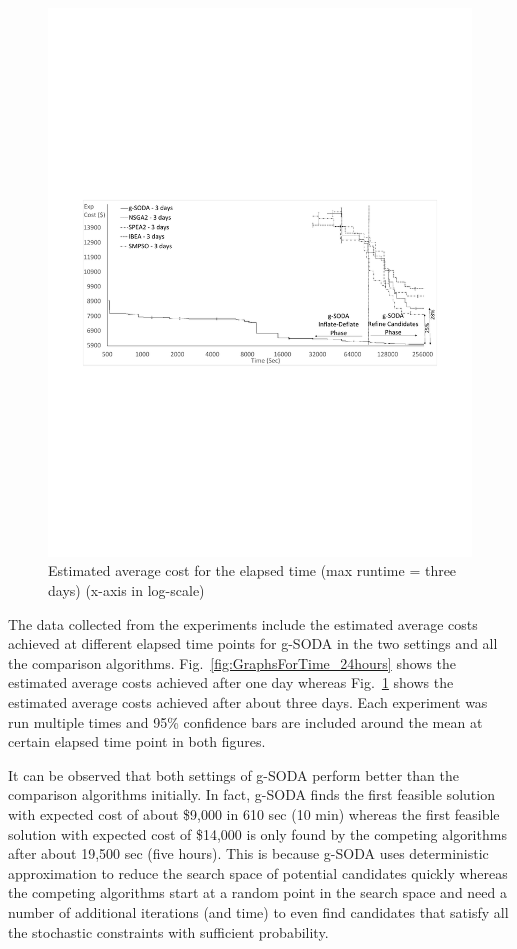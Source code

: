 \documentclass[a4paper, 12pt]{article} %
\begin{document}
\begin{figure}[t]
\begin{minipage}{.5\textwidth}
\begin{center}
	\includegraphics[width=\textwidth]{images/sodavsjmetal3day.pdf}
	\caption{Estimated average cost for the elapsed time (max runtime = three days) (x-axis in log-scale)}
	\label{fig:GraphsForTime_3days}       %
\end{center}
\end{minipage}
\end{figure}

The data collected from the experiments include the estimated average costs achieved at different elapsed time points for g-SODA in the two settings and all the comparison algorithms. 
Fig.~\ref{fig:GraphsForTime_24hours} shows the estimated average costs achieved after one day whereas Fig.~\ref{fig:GraphsForTime_3days} shows the estimated average costs achieved after about three days. Each experiment was run multiple times and 95\% confidence bars are included around the mean at certain elapsed time point in both figures. 

It can be observed that both settings of g-SODA perform better than the comparison algorithms initially. In fact, g-SODA finds the first feasible solution with expected cost of about \$9,000 in 610 sec (10 min) whereas the first feasible solution with expected cost of \$14,000 is only found by the competing algorithms after about 19,500 sec (five hours). This is because g-SODA uses deterministic approximation to reduce the search space of potential candidates quickly whereas the competing algorithms start at a random point in the search space and need a number of additional iterations (and time) to even find candidates that satisfy all the stochastic constraints with sufficient probability. 
\end{document}
